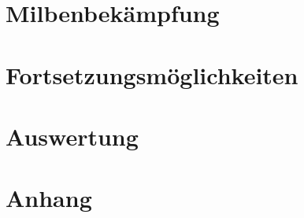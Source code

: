 \documentclass[11pt,a4paper]{article}
\begin{document}
\newpage
\section{Milbenbekämpfung}

\newpage
\section{Fortsetzungsmöglichkeiten}


\newpage
\section{Auswertung}

\newpage
\section{Anhang}
\end{document}
